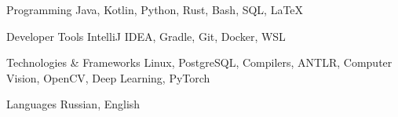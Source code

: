 

\begin{cvskills}

  \cvskill
    {Programming} %
    {Java, Kotlin, Python, Rust, Bash, SQL, LaTeX} %

  \cvskill
  {Developer Tools} %
  {IntelliJ IDEA, Gradle, Git, Docker, WSL} %

  \cvskill
  {Technologies \& Frameworks} %
  {Linux, PostgreSQL, Compilers, ANTLR, Computer Vision, OpenCV, Deep Learning, PyTorch} %

  \cvskill
    {Languages} %
    {Russian, English} %

\end{cvskills}

